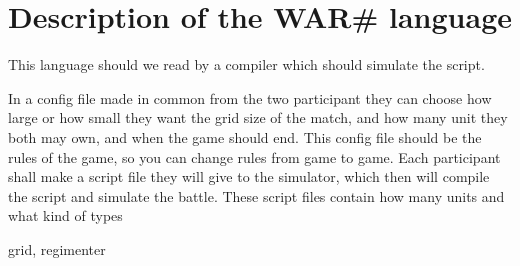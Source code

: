 
\section{ Description of the WAR\# language }

This language should we read by a compiler which should simulate the script.


In a config file made in common from the two participant they can choose how large or how small they want the grid size of the match, and how many unit they both may own, and when the game should end. This config file should be the rules of the game, so you can change rules from game to game.
Each participant shall make a script file they will give to the simulator, which then will compile the script and simulate the battle. These script files contain how many units and what kind of types 


grid, regimenter
